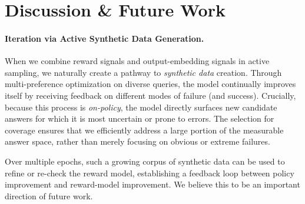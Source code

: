 

\vspace{-0.1in}
\section{Discussion \& Future Work}
\label{sec:discussion_future_work}

\vspace{-0.1in}
\paragraph{Iteration via Active Synthetic Data Generation.}
When we combine reward signals and output-embedding signals in active sampling, we naturally create a pathway to \emph{synthetic data} creation. Through multi-preference optimization on diverse queries, the model continually improves itself by receiving feedback on different modes of failure (and success). Crucially, because this process is \emph{on-policy}, the model directly surfaces new candidate answers for which it is most uncertain or prone to errors. The selection for coverage ensures that we efficiently address a large portion of the measurable answer space, rather than merely focusing on obvious or extreme failures.

Over multiple epochs, such a growing corpus of synthetic data can be used to refine or re-check the reward model, establishing a feedback loop between policy improvement and reward-model improvement. We believe this to be an important direction of future work.


